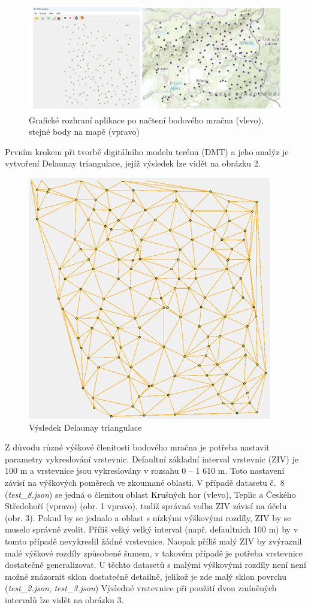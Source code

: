 \documentclass{article}
\begin{document}
\begin{spacing}{1.5}
\begin{figure}[h]
    \centering
    \includegraphics[width=0.9\linewidth]{images/01rozhrani.png}
    \caption{Grafické rozhraní aplikace po načtení bodového mračna (vlevo), stejné body na mapě (vpravo)}
    \label{fig:enter-label}
\end{figure}

Prvním krokem při tvorbě digitálního modelu terénu (DMT) a jeho analýz je vytvoření Delaunay triangulace, jejíž výsledek lze vidět na obrázku 2.

\begin{figure}[h]
    \centering
    \includegraphics[width=0.4\linewidth]{images/02triangulace.png}
    \caption{Výsledek Delaunay triangulace}
    \label{fig:enter-label}
\end{figure}

\newpage
Z důvodu různé výškové členitosti bodového mračna je potřeba nastavit parametry vykreslování vrstevnic. Defaultní základní interval vrstevnic (ZIV) je 100 m a vrstevnice jsou vykreslovány v rozsahu 0 – 1 610 m. Toto nastavení závisí na výškových poměrech ve zkoumané oblasti. V případě datasetu č.~8 (\textit{test\_8.json}) se jedná o členitou oblast Krušných hor (vlevo), Teplic a Českého Středohoří (vpravo) (obr. 1 vpravo), tudíž správná volba ZIV závisí na účelu (obr. 3). Pokud by se jednalo a oblast s nízkými výškovými rozdíly, ZIV by se muselo správně zvolit. Příliš velký velký interval (např. defaultních 100 m) by v tomto případě nevykreslil žádné vrstevnice. Naopak příliš malý ZIV by zvýraznil malé výškové rozdíly způsobené šumem, v takovém případě je potřeba vrstevnice dostatečně generalizovat. U těchto datasetů s malými výškovými rozdíly není není možné znázornit sklon dostatečně detailně, jelikož je zde malý sklon povrchu (\textit{test\_2.json}, \textit{test\_3.json}) Výsledné vrstevnice při použití dvou zmíněných intervalů lze vidět na obrázku 3.


\end{spacing}
\end{document}
